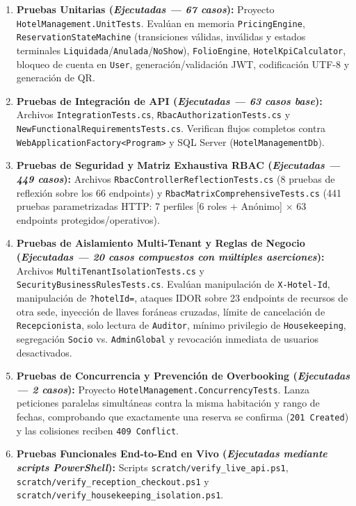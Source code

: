 \documentclass[12pt,a4paper]{article}
\begin{document}
\begin{enumerate}
    \item \textbf{Pruebas Unitarias (\textit{Ejecutadas --- 67 casos}):} Proyecto \texttt{HotelManagement.UnitTests}. Eval\'uan en memoria \texttt{PricingEngine}, \texttt{ReservationStateMachine} (transiciones v\'alidas, inv\'alidas y estados terminales \texttt{Liquidada}/\texttt{Anulada}/\texttt{NoShow}), \texttt{FolioEngine}, \texttt{HotelKpiCalculator}, bloqueo de cuenta en \texttt{User}, generaci\'on/validaci\'on JWT, codificaci\'on UTF-8 y generaci\'on de QR.
    \item \textbf{Pruebas de Integraci\'on de API (\textit{Ejecutadas --- 63 casos base}):} Archivos \texttt{IntegrationTests.cs}, \texttt{RbacAuthorizationTests.cs} y \texttt{NewFunctionalRequirementsTests.cs}. Verifican flujos completos contra \texttt{WebApplicationFactory<Program>} y SQL Server (\texttt{HotelManagementDb}).
    \item \textbf{Pruebas de Seguridad y Matriz Exhaustiva RBAC (\textit{Ejecutadas --- 449 casos}):} Archivos \texttt{RbacControllerReflectionTests.cs} (8 pruebas de reflexi\'on sobre los 66 endpoints) y \texttt{RbacMatrixComprehensiveTests.cs} (441 pruebas parametrizadas HTTP: 7 perfiles [6 roles + An\'onimo] $\times$ 63 endpoints protegidos/operativos).
    \item \textbf{Pruebas de Aislamiento Multi-Tenant y Reglas de Negocio (\textit{Ejecutadas --- 20 casos compuestos con m\'ultiples aserciones}):} Archivos \texttt{MultiTenantIsolationTests.cs} y \texttt{SecurityBusinessRulesTests.cs}. Eval\'uan manipulaci\'on de \texttt{X-Hotel-Id}, manipulaci\'on de \texttt{?hotelId=}, ataques IDOR sobre 23 endpoints de recursos de otra sede, inyecci\'on de llaves for\'aneas cruzadas, l\'imite de cancelaci\'on de \texttt{Recepcionista}, solo lectura de \texttt{Auditor}, m\'inimo privilegio de \texttt{Housekeeping}, segregaci\'on \texttt{Socio} vs. \texttt{AdminGlobal} y revocaci\'on inmediata de usuarios desactivados.
    \item \textbf{Pruebas de Concurrencia y Prevenci\'on de Overbooking (\textit{Ejecutadas --- 2 casos}):} Proyecto \texttt{HotelManagement.ConcurrencyTests}. Lanza peticiones paralelas simult\'aneas contra la misma habitaci\'on y rango de fechas, comprobando que exactamente una reserva se confirma (\texttt{201 Created}) y las colisiones reciben \texttt{409 Conflict}.
    \item \textbf{Pruebas Funcionales End-to-End en Vivo (\textit{Ejecutadas mediante scripts PowerShell}):} Scripts \texttt{scratch/verify\_live\_api.ps1}, \texttt{scratch/verify\_reception\_checkout.ps1} y \texttt{scratch/verify\_housekeeping\_isolation.ps1}.

\end{enumerate}
\end{document}
